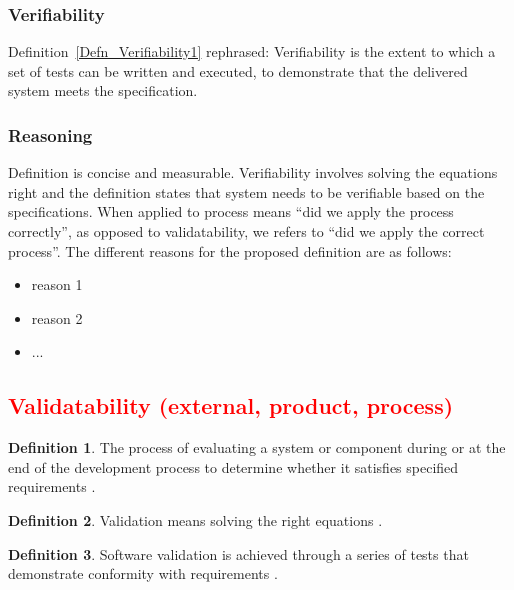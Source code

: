 \documentclass[letterpaper, cleveref]{lipics-v2019}
\newcommand{\authornote}[3]{\textcolor{#1}{[#3 ---#2]}}
\newcommand{\authornote}[3]{}
\newcommand{\oo}[1]{\authornote{magenta}{OO}{#1}} %
\newcommand{\notdone}[1]{\textcolor{red}{#1}}
\theoremstyle{definition}
\newtheorem{defn}{Definition}
\begin{document}
\begin{mybox}
\subsubsection*{Verifiability} Definition~\ref{Defn_Verifiability1}
rephrased: Verifiability is the extent to which a set of tests can be
written and executed, to demonstrate that the delivered system meets the
specification.
\end{mybox}

\subsubsection*{Reasoning} 

Definition is concise and measurable.  Verifiability involves solving the
equations right \citep[p.~23]{Roache1998} and the definition states that system
needs to be verifiable based on the specifications.  When applied to process
means ``did we apply the process correctly'', as opposed to validatability, we
refers to ``did we apply the correct process''.   The different reasons for the
proposed definition are as follows:

\begin{itemize}
  \item reason 1
  \item reason 2
  \item ...
\end{itemize}


\subsection{\notdone{Validatability (external, product, process)}} %

\begin{defn} \label{Defn_Validatability}
  The process of evaluating a system or component during or at the end of the
  development process to determine whether it satisfies specified requirements
  \citep{IEEEStdGlossarySET1990}.
\end{defn}

\begin{defn}
  Validation means solving the right equations \citep[p.~23]{Roache1998}.
\end{defn}

\begin{defn}
  Software validation is achieved through a series of tests that demonstrate
  conformity with requirements \citep{pressman2005software}.
\end{defn}
\end{document}
